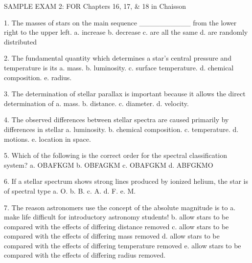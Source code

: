 




SAMPLE EXAM 2: FOR Chapters 16, 17, & 18 in Chaisson

1. The masses of stars on the main sequence __________ from the lower right to the upper left.
    a. increase
    b. decrease
    c. are all the same
    d. are randomly distributed

2. The fundamental quantity which determines a star's central pressure and temperature is its
    a. mass.
    b. luminosity.
    c. surface temperature.
    d. chemical composition.
    e. radius.

3. The determination of stellar parallax is important because it allows the direct determination of
    a. mass.
    b. distance.
    c. diameter.
    d. velocity.

4. The observed differences between stellar spectra are caused primarily by differences in stellar
    a. luminosity.
    b. chemical composition.
    c. temperature.
    d. motions.
    e. location in space.

5. Which of the following is the correct order for the spectral classification system?
    a. OBAFKGM
    b. OBFAGKM
    c. OBAFGKM
    d. ABFGKMO

6. If a stellar spectrum shows strong lines produced by ionized helium, the star is of spectral type
    a. O.
    b. B.
    c. A.
    d. F.
    e. M.

7. The reason astronomers use the concept of the absolute magnitude is to
    a. make life difficult for introductory astronomy students!
    b. allow stars to be compared with the effects of differing distance removed
    c. allow stars to be compared with the effects of differing mass removed
    d. allow stars to be compared with the effects of differing temperature removed
    e. allow stars to be compared with the effects of differing radius removed.

